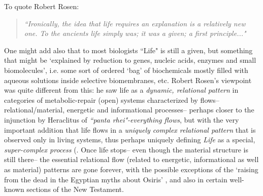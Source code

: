 \documentclass[12pt]{article}
\theoremstyle{plain}
\theoremstyle{definition}
\numberwithin{equation}{section}
\newcommand{\<}{{\langle}}
\begin{document}
To quote Robert Rosen:

\begin{quote}
\emph{``Ironically, the idea that life requires an explanation is a relatively new one. To the ancients life simply \emph {was}; it was a given; a first principle..."}
\end{quote}

One might add also that to most biologists ``Life" is still a given, but something that might be `explained by reduction
to genes, nucleic acids, enzymes and small biomolecules', i.e. some sort of ordered `bag' of biochemicals mostly filled
with aqueous solutions inside selective biomembranes, etc. Robert Rosen's viewpoint was quite different from this:
he saw life as a \emph{dynamic, relational pattern} in categories of metabolic-repair (open) systems characterized
by flows--relational/material, energetic and informational processes-- perhaps closer to the injunction by Heraclitus of \emph {``panta rhei"-everything flows}, but with the very important addition that life flows in a \emph {uniquely complex relational pattern} that is observed only in living systems, thus perhaps uniquely defining \emph{Life} as a special, \emph{super-complex process} (\cite{BBGG06}. Once life stops-- even though the material structure is still there-- the essential relational flow (related to energetic, informational as well as material) patterns are gone forever, with the possible exceptions of the `raising from the dead in the Egyptian myths about Osiris' , and also in certain well-known sections of the New Testament.
\end{document}
